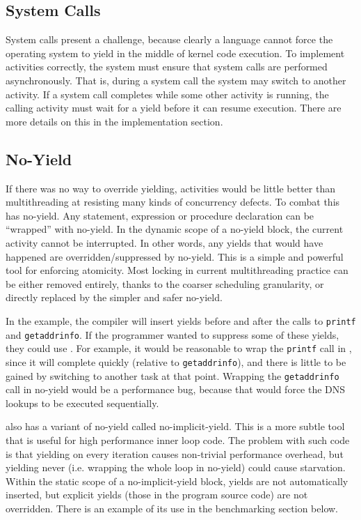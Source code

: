\documentclass[9pt,preprint]{sigplanconf}
\begin{document}
\subsection{System Calls}

System calls present a challenge, because clearly a language cannot force the operating system to yield in the middle of kernel code execution.
To implement activities correctly, the system must ensure that system calls are performed asynchronously.
That is, during a system call the system may switch to another activity.
If a system call completes while some other activity is running, the calling activity must wait for a yield before it can resume execution.
There are more details on this in the implementation section.

\subsection{No-Yield}
\label{sec:noyield}

If there was no way to override yielding, activities would be little better than multithreading at resisting many kinds of concurrency defects.
To combat this \charcoal{} has no-yield.
Any statement, expression or procedure declaration can be ``wrapped'' with no-yield.
In the dynamic scope of a no-yield block, the current activity cannot be interrupted.
In other words, any yields that would have happened are overridden/suppressed by no-yield.
This is a simple and powerful tool for enforcing atomicity.
Most locking in current multithreading practice can be either removed entirely, thanks to the coarser scheduling granularity, or directly replaced by the simpler and safer no-yield.

In the example, the compiler will insert yields before and after the calls to \texttt{printf} and \texttt{getaddrinfo}.
If the programmer wanted to suppress some of these yields, they could use \noyield{}.
For example, it would be reasonable to wrap the \texttt{printf} call in \noyield{}, since it will complete quickly (relative to \texttt{getaddrinfo}), and there is little to be gained by switching to another task at that point.
Wrapping the \texttt{getaddrinfo} call in no-yield would be a performance bug, because that would force the DNS lookups to be executed sequentially.

\charcoal{} also has a variant of no-yield called no-implicit-yield.
This is a more subtle tool that is useful for high performance inner loop code.
The problem with such code is that yielding on every iteration causes non-trivial performance overhead, but yielding never (i.e. wrapping the whole loop in no-yield) could cause starvation.
Within the static scope of a no-implicit-yield block, yields are not automatically inserted, but explicit yields (those in the program source code) are not overridden.
There is an example of its use in the benchmarking section below.
\end{document}
